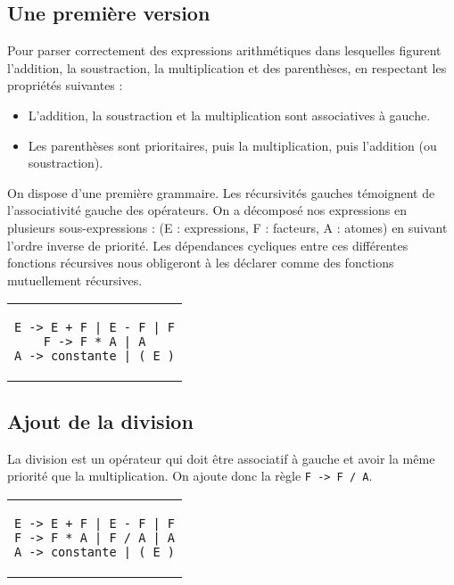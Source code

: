 \documentclass[11pt]{article}
\begin{document}
\subsection{Une première version}
Pour parser correctement des expressions arithmétiques dans lesquelles figurent l'addition, la soustraction, la multiplication et des parenthèses, en respectant les propriétés suivantes :
\begin{itemize}
\item L'addition, la soustraction et la multiplication sont associatives à gauche.
\item Les parenthèses sont prioritaires, puis la multiplication, puis l'addition (ou soustraction).
\end{itemize}

On dispose d'une première grammaire. Les récursivités gauches témoignent de l'associativité gauche des opérateurs. On a décomposé nos expressions en plusieurs sous-expressions : (E : expressions, F : facteurs, A : atomes) en suivant l'ordre inverse de priorité. Les dépendances cycliques entre ces différentes fonctions récursives nous obligeront à les déclarer comme des fonctions mutuellement récursives.

\begin{center}
\begin{tabular}{c}
\begin{lstlisting}
E -> E + F | E - F | F
F -> F * A | A
A -> constante | ( E )
\end{lstlisting}
\end{tabular}
\end{center}

\subsection{Ajout de la division}
La division est un opérateur qui doit être associatif à gauche et avoir la même priorité que la multiplication. On ajoute donc la règle \texttt{F -> F / A}.
\begin{center}
\begin{tabular}{c}
\begin{lstlisting}
E -> E + F | E - F | F
F -> F * A | F / A | A
A -> constante | ( E )
\end{lstlisting}
\end{tabular}
\end{center}
\end{document}
